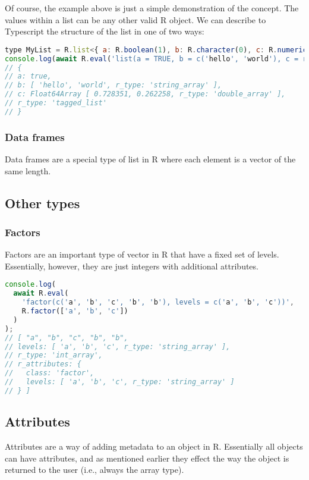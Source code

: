 \documentclass{article}
\newcommand{\prog}[1]{{\sf #1}}
\newcommand{\R}{\prog{R}}
\begin{document}
Of course, the example above is just a simple demonstration of the concept.
The values within a list can be any other valid \R{} object.
We can describe to Typescript the structure of the list in one of two ways:
\begin{lstlisting}[language=Javascript]
type MyList = R.list<{ a: R.boolean(1), b: R.character(0), c: R.numeric(2) }>;
console.log(await R.eval('list(a = TRUE, b = c('hello', 'world'), c = rnorm(2))', MyList));
// {
// a: true,
// b: [ 'hello', 'world', r_type: 'string_array' ],
// c: Float64Array [ 0.728351, 0.262258, r_type: 'double_array' ],
// r_type: 'tagged_list'
// }
\end{lstlisting}

\subsubsection{Data frames}
\label{sec:dataframes}

Data frames are a special type of list in \R{} where each element is a vector of the same length.

\subsection{Other types}
\label{sec:other}

\subsubsection{Factors}
\label{sec:factors}

Factors are an important type of vector in \R{} that have a fixed set of levels.
Essentially, however, they are just integers with additional attributes.

\begin{lstlisting}[language=Javascript, numbers=none]
console.log(
  await R.eval(
    'factor(c('a', 'b', 'c', 'b', 'b'), levels = c('a', 'b', 'c'))',
    R.factor(['a', 'b', 'c'])
  )
);
// [ "a", "b", "c", "b", "b",
// levels: [ 'a', 'b', 'c', r_type: 'string_array' ],
// r_type: 'int_array',
// r_attributes: {
//   class: 'factor',
//   levels: [ 'a', 'b', 'c', r_type: 'string_array' ]
// } ]
\end{lstlisting}

\subsection{Attributes}
\label{sec:attributes}

Attributes are a way of adding metadata to an object in \R{}.
Essentially all objects can have attributes, and as mentioned earlier they effect the way the object is returned to the user (i.e., always the array type).
\end{document}
